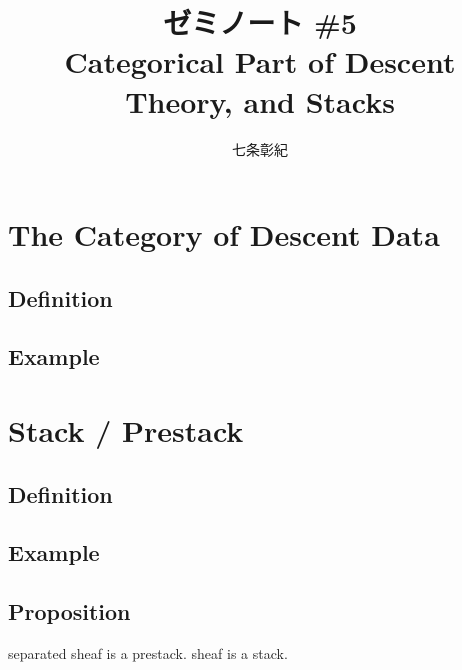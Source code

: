 \documentclass[a4paper]{jsarticle}
\begin{document}
\title{ゼミノート \#5 \\ Categorical Part of Descent Theory, and Stacks}
\author{七条彰紀}
\maketitle

\section{The Category of Descent Data}
\subsection{Definition}
\subsection{Example}

\section{Stack / Prestack}
\subsection{Definition}
\subsection{Example}
\subsection{Proposition}
\begin{Prop}
    separated sheaf is a prestack.
    sheaf is a stack.
\end{Prop}



\end{document}
